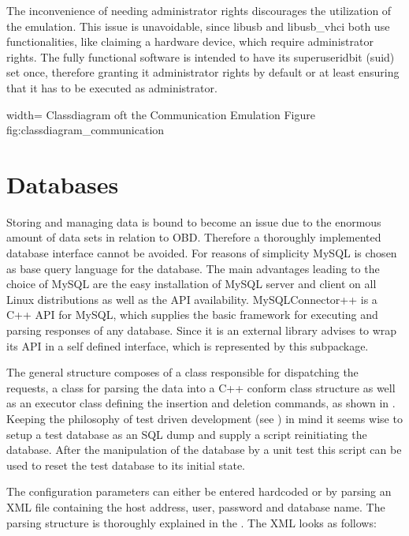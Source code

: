 The inconvenience of needing administrator rights discourages the utilization of the emulation. This issue is unavoidable, since libusb and 
libusb\_vhci both use functionalities, like claiming a hardware device, which require administrator rights. The fully functional software is 
intended to have its superuser\-id\-bit (suid) set once, therefore granting it administrator rights by default or at least ensuring that it has to be executed 
as administrator.

 {width=\textwidth}%
 {Classdiagram oft the Communication Emulation}%
 {Figure}%
 {fig:classdiagram_communication}%

\section{Databases}
\label{sec:database}
Storing and managing data is bound to become an issue due to the enormous amount of data sets in relation to OBD. Therefore a thoroughly 
implemented database interface cannot be avoided. For reasons of simplicity MySQL is chosen as base query language for the database. The main 
advantages leading to the choice of MySQL are the easy installation of MySQL server and client on all Linux distributions as well as the API 
availability. MySQLConnector++ \cite{MYSQL} is a C++ API for MySQL, which supplies the basic framework for executing and parsing responses of any database. 
Since it is an external library  advises to wrap its API in a self defined interface, which is represented by this subpackage. 

The general structure composes of a class responsible for dispatching the requests, a class for parsing the data into a C++ conform class 
structure as well as an executor class defining the insertion and deletion commands, as shown in . Keeping the philosophy 
of test driven development (see ) in mind it seems wise to setup a test database as an SQL dump and supply a script reinitiating the database. 
After the manipulation of the database by a unit test this script can be used to reset the test database to its initial state. 

The configuration parameters can either be entered hardcoded or by parsing an XML file containing the host address, user, password and database 
name. The parsing structure is thoroughly explained in the . The XML looks as follows:

